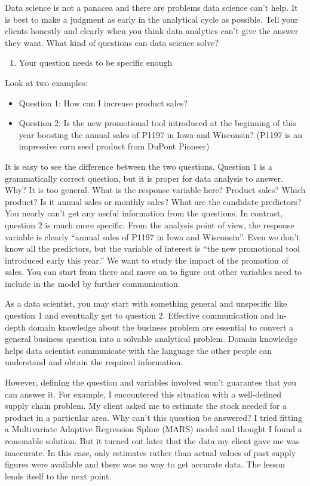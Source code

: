 \documentclass[12pt,]{krantz}
\providecommand{\tightlist}{%
  \setlength{\itemsep}{0pt}\setlength{\parskip}{0pt}}
\theoremstyle{definition}
\theoremstyle{definition}
\theoremstyle{definition}
\theoremstyle{remark}
\begin{document}
Data science is not a panacea and there are problems data science can't
help. It is best to make a judgment as early in the analytical cycle as
possible. Tell your clients honestly and clearly when you think data
analytics can't give the answer they want. What kind of questions can
data science solve?

\begin{enumerate}
\def\labelenumi{\arabic{enumi}.}
\tightlist
\item
  Your question needs to be specific enough
\end{enumerate}

Look at two examples:

\begin{itemize}
\tightlist
\item
  Question 1: How can I increase product sales?
\item
  Question 2: Is the new promotional tool introduced at the beginning of
  this year boosting the annual sales of P1197 in Iowa and Wisconsin?
  (P1197 is an impressive corn seed product from DuPont Pioneer)
\end{itemize}

It is easy to see the difference between the two questions. Question 1
is a grammatically correct question, but it is proper for data analysis
to answer. Why? It is too general. What is the response variable here?
Product sales? Which product? Is it annual sales or monthly sales? What
are the candidate predictors? You nearly can't get any useful
information from the questions. In contrast, question 2 is much more
specific. From the analysis point of view, the response variable is
clearly ``annual sales of P1197 in Iowa and Wisconsin''. Even we don't
know all the predictors, but the variable of interest is ``the new
promotional tool introduced early this year.'' We want to study the
impact of the promotion of sales. You can start from there and move on
to figure out other variables need to include in the model by further
communication.

As a data scientist, you may start with something general and unspecific
like question 1 and eventually get to question 2. Effective
communication and in-depth domain knowledge about the business problem
are essential to convert a general business question into a solvable
analytical problem. Domain knowledge helps data scientist communicate
with the language the other people can understand and obtain the
required information.

However, defining the question and variables involved won't guarantee
that you can answer it. For example, I encountered this situation with a
well-defined supply chain problem. My client asked me to estimate the
stock needed for a product in a particular area. Why can't this question
be answered? I tried fitting a Multivariate Adaptive Regression Spline
(MARS) model and thought I found a reasonable solution. But it turned
out later that the data my client gave me was inaccurate. In this case,
only estimates rather than actual values of past supply figures were
available and there was no way to get accurate data. The lesson lends
itself to the next point.
\end{document}
